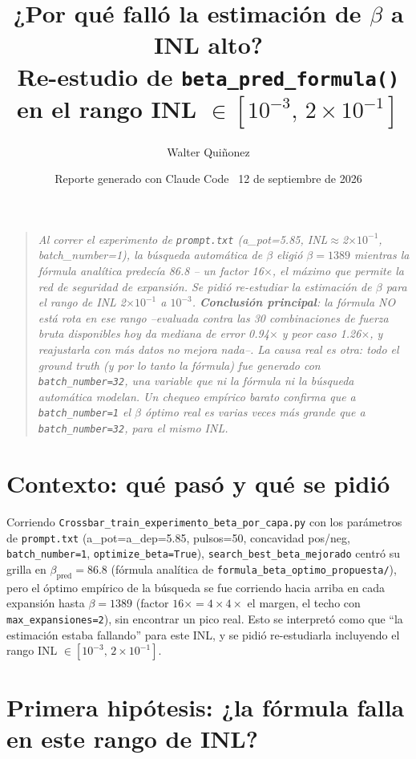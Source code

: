 \documentclass[11pt]{article}
\title{\textbf{¿Por qué falló la estimación de $\beta$ a INL alto?}\\
\large Re-estudio de \texttt{beta\_pred\_formula()} en el rango INL $\in[10^{-3},\,2\times10^{-1}]$}
\author{Walter Quiñonez}
\date{Reporte generado con Claude Code \textperiodcentered\ 12 de septiembre de 2026}
\begin{document}
\maketitle

\begin{quote}\itshape
Al correr el experimento de \texttt{prompt.txt} (a\_pot=5.85, INL$\approx$2$\times10^{-1}$,
batch\_number=1), la búsqueda automática de $\beta$ eligió $\beta=1389$ mientras la fórmula
analítica predecía 86.8 -- un factor 16$\times$, el máximo que permite la red de seguridad de
expansión. Se pidió re-estudiar la estimación de $\beta$ para el rango de INL 2$\times10^{-1}$
a $10^{-3}$. \textbf{Conclusión principal}: la fórmula NO está rota en ese rango --evaluada
contra las 30 combinaciones de fuerza bruta disponibles hoy da mediana de error 0.94$\times$ y
peor caso 1.26$\times$, y reajustarla con más datos no mejora nada--. La causa real es otra:
todo el ground truth (y por lo tanto la fórmula) fue generado con \texttt{batch\_number=32},
una variable que ni la fórmula ni la búsqueda automática modelan. Un chequeo empírico barato
confirma que a \texttt{batch\_number=1} el $\beta$ óptimo real es varias veces más grande que a
\texttt{batch\_number=32}, para el mismo INL.
\end{quote}

\tableofcontents

\section{Contexto: qué pasó y qué se pidió}

Corriendo \texttt{Crossbar\_train\_experimento\_beta\_por\_capa.py} con los parámetros de
\texttt{prompt.txt} (a\_pot=a\_dep=5.85, pulsos=50, concavidad pos/neg, \texttt{batch\_number=1},
\texttt{optimize\_beta=True}), \texttt{search\_best\_beta\_mejorado} centró su grilla en
$\beta_{\text{pred}}=86.8$ (fórmula analítica de \texttt{formula\_beta\_optimo\_propuesta/}),
pero el óptimo empírico de la búsqueda se fue corriendo hacia arriba en cada expansión hasta
$\beta=1389$ (factor $16\times=4\times4\times$ el margen, el techo con
\texttt{max\_expansiones=2}), sin encontrar un pico real. Esto se interpretó como que ``la
estimación estaba fallando'' para este INL, y se pidió re-estudiarla incluyendo el rango
INL $\in[10^{-3},\,2\times10^{-1}]$.

\section{Primera hipótesis: ¿la fórmula falla en este rango de INL?}
\end{document}
